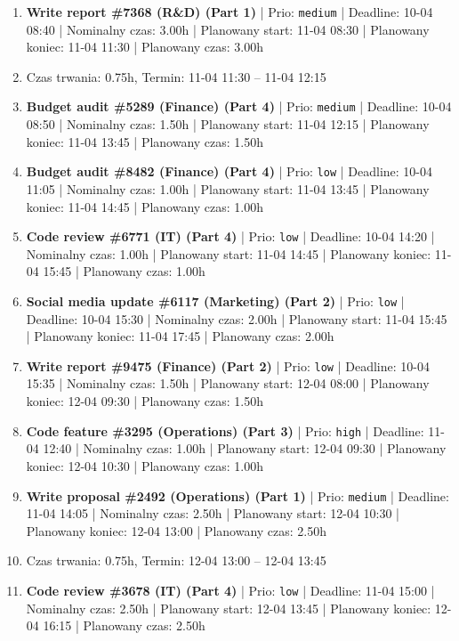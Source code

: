 {\begin{enumerate}
  \item [\textbf{14633}] \textbf{Write report \#7368 (R\&D) (Part 1)} | Prio: \texttt{medium} | Deadline: 10-04 08:40 | Nominalny czas: 3.00h | Planowany start: 11-04 08:30 | Planowany koniec: 11-04 11:30 | Planowany czas: 3.00h
  \item [\textbf{PRZERWA}] Czas trwania: 0.75h, Termin: 11-04 11:30 -- 11-04 12:15
  \item [\textbf{14630}] \textbf{Budget audit \#5289 (Finance) (Part 4)} | Prio: \texttt{medium} | Deadline: 10-04 08:50 | Nominalny czas: 1.50h | Planowany start: 11-04 12:15 | Planowany koniec: 11-04 13:45 | Planowany czas: 1.50h
  \item [\textbf{14694}] \textbf{Budget audit \#8482 (Finance) (Part 4)} | Prio: \texttt{low} | Deadline: 10-04 11:05 | Nominalny czas: 1.00h | Planowany start: 11-04 13:45 | Planowany koniec: 11-04 14:45 | Planowany czas: 1.00h
  \item [\textbf{14681}] \textbf{Code review \#6771 (IT) (Part 4)} | Prio: \texttt{low} | Deadline: 10-04 14:20 | Nominalny czas: 1.00h | Planowany start: 11-04 14:45 | Planowany koniec: 11-04 15:45 | Planowany czas: 1.00h
  \item [\textbf{14700}] \textbf{Social media update \#6117 (Marketing) (Part 2)} | Prio: \texttt{low} | Deadline: 10-04 15:30 | Nominalny czas: 2.00h | Planowany start: 11-04 15:45 | Planowany koniec: 11-04 17:45 | Planowany czas: 2.00h
  \item [\textbf{14685}] \textbf{Write report \#9475 (Finance) (Part 2)} | Prio: \texttt{low} | Deadline: 10-04 15:35 | Nominalny czas: 1.50h | Planowany start: 12-04 08:00 | Planowany koniec: 12-04 09:30 | Planowany czas: 1.50h
  \item [\textbf{14608}] \textbf{Code feature \#3295 (Operations) (Part 3)} | Prio: \texttt{high} | Deadline: 11-04 12:40 | Nominalny czas: 1.00h | Planowany start: 12-04 09:30 | Planowany koniec: 12-04 10:30 | Planowany czas: 1.00h
  \item [\textbf{14668}] \textbf{Write proposal \#2492 (Operations) (Part 1)} | Prio: \texttt{medium} | Deadline: 11-04 14:05 | Nominalny czas: 2.50h | Planowany start: 12-04 10:30 | Planowany koniec: 12-04 13:00 | Planowany czas: 2.50h
  \item [\textbf{PRZERWA}] Czas trwania: 0.75h, Termin: 12-04 13:00 -- 12-04 13:45
  \item [\textbf{14699}] \textbf{Code review \#3678 (IT) (Part 4)} | Prio: \texttt{low} | Deadline: 11-04 15:00 | Nominalny czas: 2.50h | Planowany start: 12-04 13:45 | Planowany koniec: 12-04 16:15 | Planowany czas: 2.50h

\end{enumerate}}
